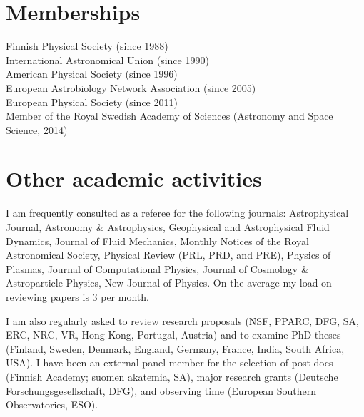 \documentclass{article}
\begin{document}

\section*{Memberships}

Finnish Physical Society (since 1988) \\
International Astronomical Union (since 1990) \\
American Physical Society (since 1996) \\
European Astrobiology Network Association (since 2005) \\
European Physical Society (since 2011) \\
Member of the Royal Swedish Academy of Sciences (Astronomy and Space Science, 2014)\\

\section*{Other academic activities}

I am frequently consulted as a referee for the following journals:
Astrophysical Journal, Astronomy \& Astrophysics, Geophysical and
Astrophysical Fluid Dynamics, Journal of Fluid Mechanics,
Monthly Notices of the Royal Astronomical Society,
Physical Review (PRL, PRD, and PRE), Physics of Plasmas,
Journal of Computational Physics,
Journal of Cosmology \& Astroparticle Physics,
New Journal of Physics.
On the average my load on reviewing papers is 3 per month.

I am also regularly asked to review research proposals
(NSF, PPARC, DFG, SA, ERC, NRC, VR, Hong Kong, Portugal, Austria)
and to examine PhD theses (Finland, Sweden, Denmark, England, Germany,
France, India, South Africa, USA).
I have been an external panel member for the selection of post-docs
(Finnish Academy; suomen akatemia, SA),
major research grants (Deutsche Forschungsgesellschaft, DFG),
and observing time (European Southern Observatories, ESO).
\end{document}

